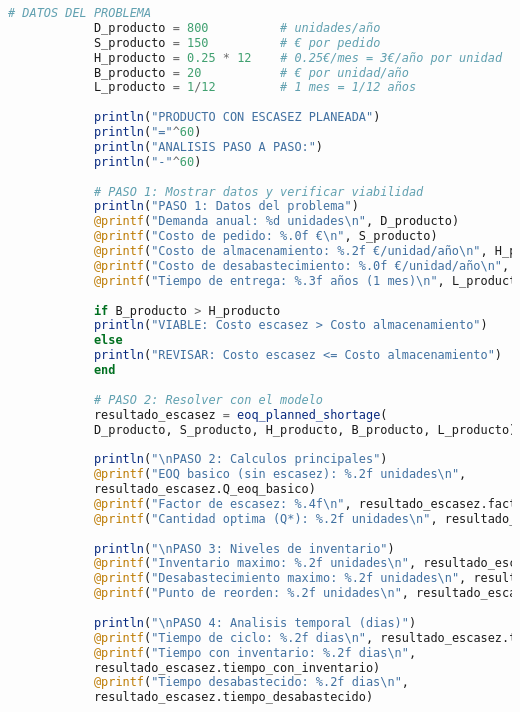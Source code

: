 \documentclass[12pt,a4paper]{book}
\begin{document}
	\begin{tcolorbox}[enhanced,colback=azulclaro,colframe=azulprincipal,boxrule=2pt,arc=8pt,
		title={\bfseries\color{white} \faCode\ SOLUCI\'ON DETALLADA},breakable]
		
		\begin{lstlisting}[language=Julia,basicstyle=\footnotesize\ttfamily]
			# DATOS DEL PROBLEMA
			D_producto = 800          # unidades/año
			S_producto = 150          # € por pedido  
			H_producto = 0.25 * 12    # 0.25€/mes = 3€/año por unidad
			B_producto = 20           # € por unidad/año
			L_producto = 1/12         # 1 mes = 1/12 años
			
			println("PRODUCTO CON ESCASEZ PLANEADA")
			println("="^60)
			println("ANALISIS PASO A PASO:")
			println("-"^60)
			
			# PASO 1: Mostrar datos y verificar viabilidad
			println("PASO 1: Datos del problema")
			@printf("Demanda anual: %d unidades\n", D_producto)
			@printf("Costo de pedido: %.0f €\n", S_producto)
			@printf("Costo de almacenamiento: %.2f €/unidad/año\n", H_producto)
			@printf("Costo de desabastecimiento: %.0f €/unidad/año\n", B_producto)
			@printf("Tiempo de entrega: %.3f años (1 mes)\n", L_producto)
			
			if B_producto > H_producto
			println("VIABLE: Costo escasez > Costo almacenamiento")
			else
			println("REVISAR: Costo escasez <= Costo almacenamiento")
			end
			
			# PASO 2: Resolver con el modelo
			resultado_escasez = eoq_planned_shortage(
			D_producto, S_producto, H_producto, B_producto, L_producto)
			
			println("\nPASO 2: Calculos principales")
			@printf("EOQ basico (sin escasez): %.2f unidades\n", 
			resultado_escasez.Q_eoq_basico)
			@printf("Factor de escasez: %.4f\n", resultado_escasez.factor_escasez)
			@printf("Cantidad optima (Q*): %.2f unidades\n", resultado_escasez.Q_star)
			
			println("\nPASO 3: Niveles de inventario")
			@printf("Inventario maximo: %.2f unidades\n", resultado_escasez.I_max)
			@printf("Desabastecimiento maximo: %.2f unidades\n", resultado_escasez.S_max)
			@printf("Punto de reorden: %.2f unidades\n", resultado_escasez.R)
			
			println("\nPASO 4: Analisis temporal (dias)")
			@printf("Tiempo de ciclo: %.2f dias\n", resultado_escasez.tiempo_ciclo)
			@printf("Tiempo con inventario: %.2f dias\n", 
			resultado_escasez.tiempo_con_inventario)
			@printf("Tiempo desabastecido: %.2f dias\n", 
			resultado_escasez.tiempo_desabastecido)
			

\end{lstlisting}
\end{tcolorbox}
\end{document}
